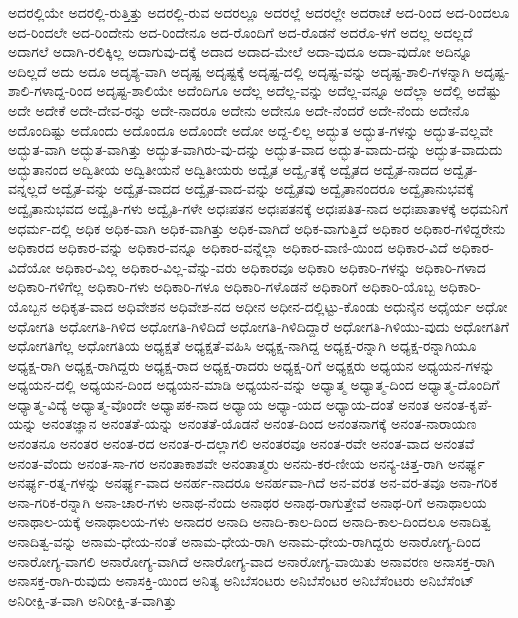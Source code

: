 {ಅದರಲ್ಲಿಯೇ
ಅದರಲ್ಲಿ-ರುತ್ತಿತ್ತು
ಅದರಲ್ಲಿ-ರುವ
ಅದರಲ್ಲೂ
ಅದರಲ್ಲೆ
ಅದರಲ್ಲೇ
ಅದರಾಚೆ
ಅದ-ರಿಂದ
ಅದ-ರಿಂದಲೂ
ಅದ-ರಿಂದಲೇ
ಅದ-ರಿಂದೇನು
ಅದ-ರಿಂದೇನೂ
ಅದ-ರೊಂದಿಗೆ
ಅದ-ರೊಡನೆ
ಅದರೊ-ಳಗೆ
ಅದಲ್ಲ
ಅದಲ್ಲದೆ
ಅದಾಗಲೆ
ಅದಾಗಿ-ರಲಿಕ್ಕಿಲ್ಲ
ಅದಾಗುವು-ದಕ್ಕೆ
ಅದಾದ
ಅದಾದ-ಮೇಲೆ
ಅದಾ-ವುದೂ
ಅದಾ-ವುದೋ
ಅದಿನ್ನೂ
ಅದಿಲ್ಲದೆ
ಅದು
ಅದೂ
ಅದೃಶ್ಯ-ವಾಗಿ
ಅದೃಷ್ಟ
ಅದೃಷ್ಟಕ್ಕೆ
ಅದೃಷ್ಟ-ದಲ್ಲಿ
ಅದೃಷ್ಟ-ವನ್ನು
ಅದೃಷ್ಟ-ಶಾಲಿ-ಗಳನ್ನಾಗಿ
ಅದೃಷ್ಟ-ಶಾಲಿ-ಗಳಾದ್ದ-ರಿಂದ
ಅದೃಷ್ಟ-ಶಾಲಿಯೇ
ಅದೆಂದಿಗೂ
ಅದೆಲ್ಲ
ಅದೆಲ್ಲ-ವನ್ನು
ಅದೆಲ್ಲ-ವನ್ನೂ
ಅದೆಲ್ಲಾ
ಅದೆಲ್ಲಿ
ಅದೆಷ್ಟು
ಅದೇ
ಅದೇಕೆ
ಅದೇ-ದೇವ-ರನ್ನು
ಅದೇ-ನಾದರೂ
ಅದೇನು
ಅದೇನೂ
ಅದೇ-ನೆಂದರೆ
ಅದೇ-ನೆಂದು
ಅದೇನೊ
ಅದೊಂದಿಷ್ಟು
ಅದೊಂದು
ಅದೊಂದೂ
ಅದೊಂದೇ
ಅದೋ
ಅದ್ದ-ಲಿಲ್ಲ
ಅದ್ಭುತ
ಅದ್ಭುತ-ಗಳನ್ನು
ಅದ್ಭುತ-ವಲ್ಲವೇ
ಅದ್ಭುತ-ವಾಗಿ
ಅದ್ಭುತ-ವಾಗಿತ್ತು
ಅದ್ಭುತ-ವಾಗಿರು-ವು-ದನ್ನು
ಅದ್ಭುತ-ವಾದ
ಅದ್ಭುತ-ವಾದು-ದನ್ನು
ಅದ್ಭುತ-ವಾದುದು
ಅದ್ಭುತಾನಂದ
ಅದ್ವಿತೀಯ
ಅದ್ವಿತೀಯನೆ
ಅದ್ವಿತೀಯರು
ಅದ್ವೈತ
ಅದ್ವೈ-ತಕ್ಕೆ
ಅದ್ವೈತದ
ಅದ್ವೈತ-ನಾದದ
ಅದ್ವೈತ-ವನ್ನಲ್ಲದೆ
ಅದ್ವೈತ-ವನ್ನು
ಅದ್ವೈತ-ವಾದದ
ಅದ್ವೈತ-ವಾದ-ವನ್ನು
ಅದ್ವೈತವು
ಅದ್ವೈತಾನಂದರೂ
ಅದ್ವೈತಾನುಭವಕ್ಕೆ
ಅದ್ವೈತಾನುಭವದ
ಅದ್ವೈತಿ-ಗಳು
ಅದ್ವೈತಿ-ಗಳೇ
ಅಧಃಪತನ
ಅಧಃಪತನಕ್ಕೆ
ಅಧಃಪತಿತ-ನಾದ
ಅಧಃಪಾತಾಳಕ್ಕೆ
ಅಧಮನಿಗೆ
ಅಧರ್ಮ-ದಲ್ಲಿ
ಅಧಿಕ
ಅಧಿಕ-ವಾಗಿ
ಅಧಿಕ-ವಾಗಿತ್ತು
ಅಧಿಕ-ವಾಗಿದೆ
ಅಧಿಕ-ವಾಗುತ್ತಿದೆ
ಅಧಿಕಾರ
ಅಧಿಕಾರ-ಗಳಿದ್ದರೇನು
ಅಧಿಕಾರದ
ಅಧಿಕಾರ-ವನ್ನು
ಅಧಿಕಾರ-ವನ್ನೂ
ಅಧಿಕಾರ-ವನ್ನೆಲ್ಲಾ
ಅಧಿಕಾರ-ವಾಣಿ-ಯಿಂದ
ಅಧಿಕಾರ-ವಿದೆ
ಅಧಿಕಾರ-ವಿದೆಯೋ
ಅಧಿಕಾರ-ವಿಲ್ಲ
ಅಧಿಕಾರ-ವಿಲ್ಲ-ವೆನ್ನು-ವರು
ಅಧಿಕಾರವೂ
ಅಧಿಕಾರಿ
ಅಧಿಕಾರಿ-ಗಳನ್ನು
ಅಧಿಕಾರಿ-ಗಳಾದ
ಅಧಿಕಾರಿ-ಗಳಿಗೆಲ್ಲ
ಅಧಿಕಾರಿ-ಗಳು
ಅಧಿಕಾರಿ-ಗಳೂ
ಅಧಿಕಾರಿ-ಗಳೊಡನೆ
ಅಧಿಕಾರಿಗೆ
ಅಧಿಕಾರಿ-ಯೊಬ್ಬ
ಅಧಿಕಾರಿ-ಯೊಬ್ಬನ
ಅಧಿಕೃತ-ವಾದ
ಅಧಿವೇಶನ
ಅಧಿವೇಶ-ನದ
ಅಧೀನ
ಅಧೀನ-ದಲ್ಲಿಟ್ಟು-ಕೊಂಡು
ಅಧುನೈನ
ಅಧೈರ್ಯ
ಅಧೋ
ಅಧೋಗತಿ
ಅಧೋಗತಿ-ಗಿಳಿದ
ಅಧೋಗತಿ-ಗಿಳಿದಿದೆ
ಅಧೋಗತಿ-ಗಿಳಿದಿದ್ದಾರೆ
ಅಧೋಗತಿ-ಗಿಳಿಯು-ವುದು
ಅಧೋಗತಿಗೆ
ಅಧೋಗತಿಗೆಲ್ಲ
ಅಧೋಗತಿಯ
ಅಧ್ಯಕ್ಷತೆ
ಅಧ್ಯಕ್ಷತೆ-ವಹಿಸಿ
ಅಧ್ಯಕ್ಷ-ನಾಗಿದ್ದ
ಅಧ್ಯಕ್ಷ-ರನ್ನಾಗಿ
ಅಧ್ಯಕ್ಷ-ರನ್ನಾಗಿಯೂ
ಅಧ್ಯಕ್ಷ-ರಾಗಿ
ಅಧ್ಯಕ್ಷ-ರಾಗಿದ್ದರು
ಅಧ್ಯಕ್ಷ-ರಾದ
ಅಧ್ಯಕ್ಷ-ರಾದರು
ಅಧ್ಯಕ್ಷ-ರಿಗೆ
ಅಧ್ಯಕ್ಷರು
ಅಧ್ಯಯನ
ಅಧ್ಯಯನ-ಗಳನ್ನು
ಅಧ್ಯಯನ-ದಲ್ಲಿ
ಅಧ್ಯಯನ-ದಿಂದ
ಅಧ್ಯಯನ-ಮಾಡಿ
ಅಧ್ಯಯನ-ವನ್ನು
ಅಧ್ಯಾತ್ಮ
ಅಧ್ಯಾತ್ಮ-ದಿಂದ
ಅಧ್ಯಾತ್ಮ-ದೊಂದಿಗೆ
ಅಧ್ಯಾತ್ಮ-ವಿದ್ಯೆ
ಅಧ್ಯಾತ್ಮ-ವೊಂದೇ
ಅಧ್ಯಾಪಕ-ನಾದ
ಅಧ್ಯಾಯ
ಅಧ್ಯಾ-ಯದ
ಅಧ್ಯಾಯ-ದಂತೆ
ಅನಂತ
ಅನಂತ-ಕೃಪೆ-ಯನ್ನು
ಅನಂತಜ್ಞಾನ
ಅನಂತತೆ-ಯನ್ನು
ಅನಂತತೆ-ಯೊಡನೆ
ಅನಂತ-ದಿಂದ
ಅನಂತನಾಗಕ್ಕೆ
ಅನಂತ-ನಾರಾಯಣ
ಅನಂತನೂ
ಅನಂತರ
ಅನಂತ-ರದ
ಅನಂತ-ರ-ದಲ್ಲಾಗಲಿ
ಅನಂತರವೂ
ಅನಂತ-ರವೇ
ಅನಂತ-ವಾದ
ಅನಂತವೆ
ಅನಂತ-ವೆಂದು
ಅನಂತ-ಸಾ-ಗರ
ಅನಂತಾಕಾಶವೇ
ಅನಂತಾತ್ಮರು
ಅನನು-ಕರ-ಣೀಯ
ಅನನ್ಯ-ಚಿತ್ತ-ರಾಗಿ
ಅನರ್ಘ್ಯ
ಅನರ್ಘ್ಯ-ರತ್ನ-ಗಳನ್ನು
ಅನರ್ಘ್ಯ-ವಾದ
ಅನರ್ಹ-ನಾದರೂ
ಅನರ್ಹವಾ-ಗಿದೆ
ಅನ-ವರತ
ಅನ-ವರ-ತವೂ
ಅನಾ-ಗರಿಕ
ಅನಾ-ಗರಿಕ-ರನ್ನಾಗಿ
ಅನಾ-ಚಾರ-ಗಳು
ಅನಾಥ-ನೆಂದು
ಅನಾಥರ
ಅನಾಥ-ರಾಗುತ್ತೇವೆ
ಅನಾಥ-ರಿಗೆ
ಅನಾಥಾಲಯ
ಅನಾಥಾಲ-ಯಕ್ಕೆ
ಅನಾಥಾಲಯ-ಗಳು
ಅನಾದರ
ಅನಾದಿ
ಅನಾದಿ-ಕಾಲ-ದಿಂದ
ಅನಾದಿ-ಕಾಲ-ದಿಂದಲೂ
ಅನಾದಿತ್ವ
ಅನಾದಿತ್ವ-ವನ್ನು
ಅನಾಮ-ಧೇಯ-ನಂತೆ
ಅನಾಮ-ಧೇಯ-ರಾಗಿ
ಅನಾಮ-ಧೇಯ-ರಾಗಿದ್ದರು
ಅನಾರೋಗ್ಯ-ದಿಂದ
ಅನಾರೋಗ್ಯ-ವಾಗಲಿ
ಅನಾರೋಗ್ಯ-ವಾಗಿದೆ
ಅನಾರೋಗ್ಯ-ವಾದ
ಅನಾರೋಗ್ಯ-ವಾಯಿತು
ಅನಾವರಣ
ಅನಾಸಕ್ತ-ರಾಗಿ
ಅನಾಸಕ್ತ-ರಾಗಿ-ರುವುದು
ಅನಾಸಕ್ತಿ-ಯಿಂದ
ಅನಿತ್ಯ
ಅನಿಬೆಸಂಟರು
ಅನಿಬೆಸೆಂಟರ
ಅನಿಬೆಸೆಂಟರು
ಅನಿಬೆಸೆಂಟ್
ಅನಿರೀಕ್ಷಿ-ತ-ವಾಗಿ
ಅನಿರೀಕ್ಷಿ-ತ-ವಾಗಿತ್ತು
}

